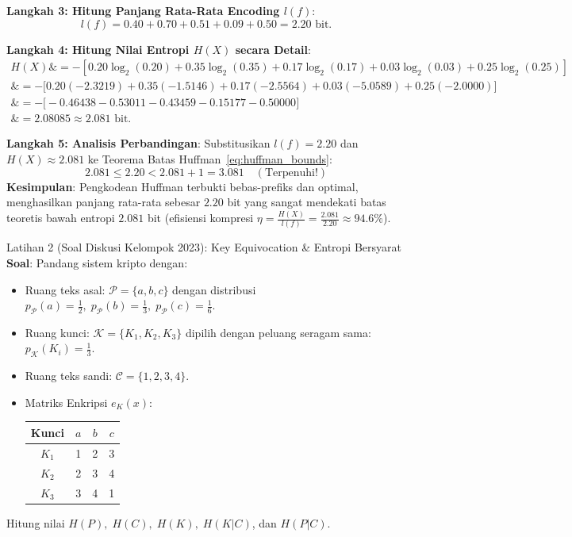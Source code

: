 \documentclass[11pt,a4paper]{article}
\begin{document}
\noindent\textbf{Langkah 3: Hitung Panjang Rata-Rata Encoding $l(f)$}:
\[
l(f) = 0.40 + 0.70 + 0.51 + 0.09 + 0.50 = 2.20 \text{ bit}.
\]

\noindent\textbf{Langkah 4: Hitung Nilai Entropi $H(X)$ secara Detail}:
\begin{align*}
H(X) \&= - \left[ 0.20\log_2(0.20) + 0.35\log_2(0.35) + 0.17\log_2(0.17) + 0.03\log_2(0.03) + 0.25\log_2(0.25) \right] \\
\&= - \Big[ 0.20(-2.3219) + 0.35(-1.5146) + 0.17(-2.5564) + 0.03(-5.0589) + 0.25(-2.0000) \Big] \\
\&= - \Big[ -0.46438 - 0.53011 - 0.43459 - 0.15177 - 0.50000 \Big] \\
\&= 2.08085 \approx 2.081 \text{ bit}.
\end{align*}

\noindent\textbf{Langkah 5: Analisis Perbandingan}:
Substitusikan $l(f) = 2.20$ dan $H(X) \approx 2.081$ ke Teorema Batas Huffman~\eqref{eq:huffman_bounds}:
\[
2.081 \le 2.20 < 2.081 + 1 = 3.081 \quad (\text{Terpenuhi!})
\]
\textbf{Kesimpulan}: Pengkodean Huffman terbukti bebas-prefiks dan optimal, menghasilkan panjang rata-rata sebesar $2.20$ bit yang sangat mendekati batas teoretis bawah entropi $2.081$ bit (efisiensi kompresi $\eta = \frac{H(X)}{l(f)} = \frac{2.081}{2.20} \approx 94.6\%$).

\vspace{0.6cm}

\begin{exercisebox}{Latihan 2 (Soal Diskusi Kelompok 2023): Key Equivocation \& Entropi Bersyarat}
\textbf{Soal}:
Pandang sistem kripto dengan:
\begin{itemize}
    \item Ruang teks asal: $\mathcal{P} = \{a, b, c\}$ dengan distribusi $p_{\mathcal{P}}(a) = \frac{1}{2}, \; p_{\mathcal{P}}(b) = \frac{1}{3}, \; p_{\mathcal{P}}(c) = \frac{1}{6}$.
    \item Ruang kunci: $\mathcal{K} = \{K_1, K_2, K_3\}$ dipilih dengan peluang seragam sama: $p_{\mathcal{K}}(K_i) = \frac{1}{3}$.
    \item Ruang teks sandi: $\mathcal{C} = \{1, 2, 3, 4\}$.
    \item Matriks Enkripsi $e_K(x)$:
    \begin{center}
    \begin{tabular}{c|ccc}
    \toprule
    Kunci & $a$ & $b$ & $c$ \\
    \midrule
    $K_1$ & 1 & 2 & 3 \\
    $K_2$ & 2 & 3 & 4 \\
    $K_3$ & 3 & 4 & 1 \\
    \bottomrule
    \end{tabular}
    \end{center}
\end{itemize}
Hitung nilai $H(P), \; H(C), \; H(K), \; H(K|C)$, dan $H(P|C)$.
\end{exercisebox}
\end{document}
